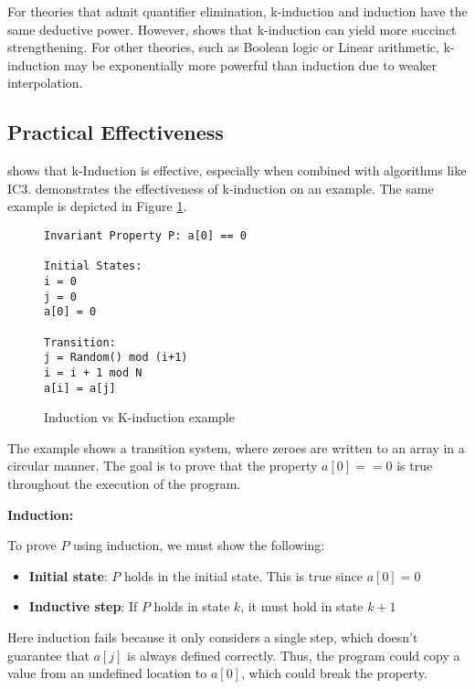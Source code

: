 For theories that admit quantifier elimination, k-induction and induction have the same deductive power. However, \cite{Bjørner2015} shows that k-induction can yield more succinct strengthening. For other theories, such as Boolean logic or Linear arithmetic, k-induction may be exponentially more powerful than induction due to weaker interpolation.

\subsection*{Practical Effectiveness}
\noindent \cite{7886665} shows that k-Induction is effective, especially when combined with algorithms like IC3.
\cite{7886665} demonstrates the effectiveness of k-induction on an example. The same example is depicted in Figure \ref{ex:ind vs kind}.

\begin{figure}[h]
    \begin{mdframed}
        \begin{lstlisting}
Invariant Property P: a[0] == 0

Initial States:
i = 0
j = 0
a[0] = 0

Transition:
j = Random() mod (i+1)
i = i + 1 mod N
a[i] = a[j]
        \end{lstlisting}
        \caption{Induction vs K-induction example}\label{ex:ind vs kind}
    \end{mdframed}
\end{figure}

\vspace{\baselineskip}The example shows a transition system, where zeroes are written to an array in a circular manner. The goal is to prove that the property $a[0] == 0$ is true throughout the execution of the program.

\newpage
\vspace{\baselineskip}\noindent \textbf{Induction:}

\vspace{\baselineskip}\noindent To prove \( P \) using induction, we must show the following:
\begin{itemize}
    \item\textbf{Initial state}: \( P \) holds in the initial state. This is true since $a[0] = 0$
    \item\textbf{Inductive step}: If \( P \) holds in state \( k \), it must hold in state \( k + 1\)
\end{itemize}

Here induction fails because it only considers a single step, which doesn't guarantee that $a[j]$ is always defined correctly. Thus, the program could copy a value from an undefined location to $a[0]$, which could break the property.

